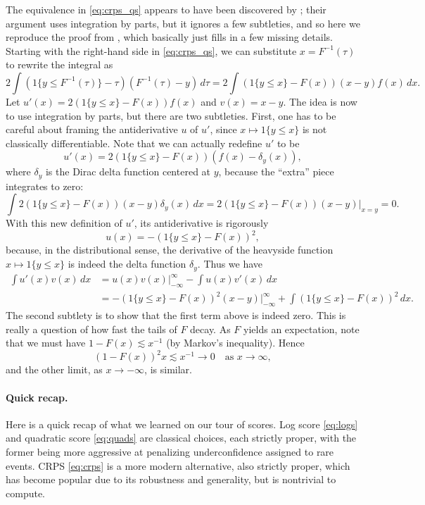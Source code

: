 \documentclass{article}
\begin{document}
The equivalence in \eqref{eq:crps_qs} appears to have been discovered by
\citet{laio2007verification}; their argument uses integration by parts, but it
ignores a few subtleties, and so here we reproduce the proof from
\citet{fakoor2021flexible}, which basically just fills in a few missing details.
Starting with the right-hand side in \eqref{eq:crps_qs}, we can substitute 
$x=F^{-1}(\tau)$ to rewrite the integral as   
\[
2 \int (1\{y \leq F^{-1}(\tau)\} - \tau) (F^{-1}(\tau)-y) \, d\tau =  
2 \int (1\{y \leq x\} - F(x)) (x-y) f(x) \, dx.
\]
Let $u'(x)=2(1\{y \leq x\} - F(x)) f(x)$ and $v(x)=x-y$. The idea is now to use 
integration by parts, but there are two subtleties. First, one has to be careful 
about framing the antiderivative $u$ of $u'$, since $x \mapsto 1\{y \leq x\}$ is
not classically differentiable. Note that we can actually redefine $u'$ to be   
\[
u'(x) = 2(1\{y \leq x\} - F(x)) (f(x) - \delta_y(x)),
\]
where $\delta_y$ is the Dirac delta function centered at $y$, because the
``extra'' piece integrates to zero:   
\[
\int 2(1\{y \leq x\} - F(x)) (x-y) \delta_y(x) \, dx =  
2(1\{y \leq x\} - F(x)) (x-y) \Big|_{x=y} = 0. 
\]
With this new definition of $u'$, its antiderivative is rigorously
\[
u(x) = -(1\{y \leq x\} - F(x))^2,
\] 
because, in the distributional sense, the derivative of the heavyside function
$x \mapsto 1\{y \leq x\}$ is indeed the delta function $\delta_y$. Thus we have   
\begin{align*}
\int u'(x) v(x) \, dx
&= u(x) v(x) \Big|_{-\infty}^\infty - \int u(x) v'(x) \,  dx \\ 
&= -(1\{y \leq x\} - F(x))^2 (x-y) \Big|_{-\infty}^\infty + 
\int (1\{y \leq x\} - F(x))^2 \, dx. 
\end{align*}
The second subtlety is to show that the first term above is indeed zero.  
This is really a question of how fast the tails of $F$ decay. As $F$ yields an
expectation, note that we must have $1-F(x) \lesssim x^{-1}$ (by Markov's inequality). Hence   
\[
(1-F(x))^2 x \lesssim x^{-1} \to 0 \quad \text{as $x \to \infty$},
\]
and the other limit, as $x \to -\infty$, is similar.

\paragraph{Quick recap.}

Here is a quick recap of what we learned on our tour of scores. Log score
\eqref{eq:logs} and quadratic score \eqref{eq:quads} are classical choices, each
strictly proper, with the former being more aggressive at penalizing
underconfidence assigned to rare events. CRPS \eqref{eq:crps} is a more modern
alternative, also strictly proper, which has become popular due to its
robustness and generality, but is nontrivial to compute.        
\end{document}
